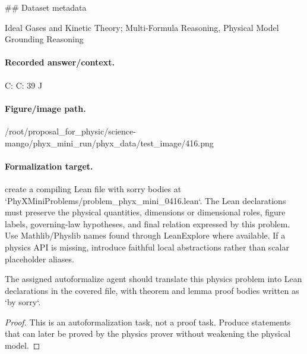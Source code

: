 \#\# Dataset metadata

Ideal Gases and Kinetic Theory; Multi-Formula Reasoning, Physical Model Grounding Reasoning

\paragraph{Recorded answer/context.}
C: C: 39 J

\paragraph{Figure/image path.}
/root/proposal\_for\_physic/science-mango/phyx\_mini\_run/phyx\_data/test\_image/416.png

\paragraph{Formalization target.}
create a compiling Lean file with sorry bodies at `PhyXMiniProblems/problem\_phyx\_mini\_0416.lean`. The Lean declarations must preserve the physical quantities, dimensions or dimensional roles, figure labels, governing-law hypotheses, and final relation expressed by this problem.
Use Mathlib/Physlib names found through LeanExplore where available. If a physics API is missing, introduce faithful local abstractions rather than scalar placeholder aliases.

\begin{theorem}
\label{thm:physics:phyx_mini_0416:target}
The assigned autoformalize agent should translate this physics problem into Lean declarations in the covered file, with theorem and lemma proof bodies written as `by sorry`.
\end{theorem}
\begin{proof}
This is an autoformalization task, not a proof task. Produce statements that can later be proved by the physics prover without weakening the physical model.
\end{proof}


